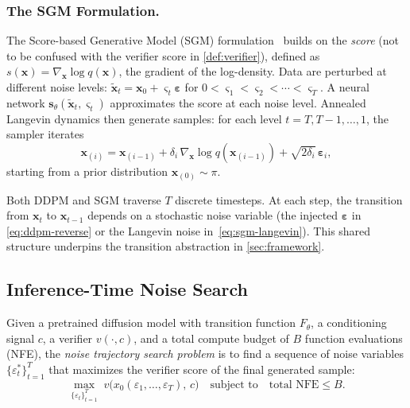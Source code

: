 \subsubsection{The SGM Formulation.}
The Score-based Generative Model (SGM) formulation~\citep{song2019generative}
builds on the \emph{score} (not to be confused with the verifier score
in \cref{def:verifier}),
defined as $s(\mathbf{x}) = \nabla_\mathbf{x} \log q(\mathbf{x})$,
the gradient of the log-density.
Data are perturbed at different noise levels:
$\tilde{\mathbf{x}}_t = \mathbf{x}_0 + \varsigma_t\boldsymbol{\varepsilon}$
for $0 < \varsigma_1 < \varsigma_2 < \cdots < \varsigma_T$.
A neural network
$\mathbf{s}_\theta(\tilde{\mathbf{x}}_t, \varsigma_t)$ approximates
the score at each noise level.
Annealed Langevin dynamics then generate samples: for each level
$t = T, T{-}1, \ldots, 1$, the sampler iterates
\begin{equation}
  \mathbf{x}_{(i)}
  = \mathbf{x}_{(i-1)}
    + \delta_i\,\nabla_\mathbf{x}\log q(\mathbf{x}_{(i-1)})
    + \sqrt{2\delta_i}\,\boldsymbol{\varepsilon}_i,
  \label{eq:sgm-langevin}
\end{equation}
starting from a prior distribution $\mathbf{x}_{(0)} \sim \pi$.

\begin{remark}
Both DDPM and SGM traverse $T$ discrete timesteps.
At each step, the transition from $\mathbf{x}_t$ to $\mathbf{x}_{t-1}$ depends
on a stochastic noise variable (the injected $\boldsymbol{\varepsilon}$ in
\eqref{eq:ddpm-reverse} or the Langevin noise in~\eqref{eq:sgm-langevin}).
This shared structure underpins the transition abstraction
in \cref{sec:framework}.
\end{remark}

\subsection{Inference-Time Noise Search}
\label{sec:noise-search-problem}

\begin{definition}
\label{def:nts}
Given a pretrained diffusion model with transition function
$F_\theta$, a conditioning signal $c$, a verifier $v(\cdot, c)$, and a total
compute budget of $B$ function evaluations (NFE), the \emph{noise trajectory
search problem} is to find a sequence of noise variables
$\{\varepsilon_t^*\}_{t=1}^T$ that maximizes the verifier score of the final
generated sample:
\begin{equation}
  \max_{\{\varepsilon_t\}_{t=1}^T}\;
  v\!\bigl(x_0(\varepsilon_1, \ldots, \varepsilon_T),\, c\bigr)
  \quad \text{subject to} \quad
  \text{total NFE} \leq B.
  \label{eq:nts-problem}
\end{equation}
\end{definition}

